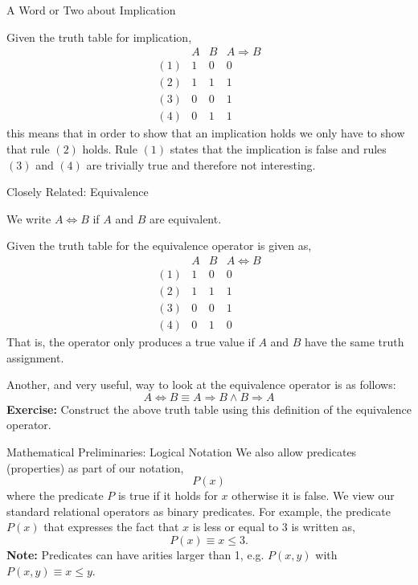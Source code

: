 \documentclass{beamer}
\begin{document}
\begin{frame}{A Word or Two about Implication}

Given the truth table for implication,
\[
\begin{array}{lcc|c}
&A & B & A \Rightarrow B\\ \hline
(1)& 1 & 0 & 0\\
(2) & 1 & 1 & 1\\
(3) & 0 & 0 & 1\\
(4) & 0 & 1 & 1
\end{array}
\]
this means that in order to show that an implication holds we only have to show that rule $(2)$
holds.  Rule $(1)$ states that the implication is false and rules $(3)$ and $(4)$ are trivially true and
therefore not interesting.
\end{frame}

\begin{frame}{Closely Related: Equivalence}

We write $A \Leftrightarrow B$ if $A$ and $B$ are equivalent.

Given the truth table for the equivalence operator is given as,
\[
\begin{array}{lcc|c}
&A & B & A \Leftrightarrow B\\ \hline
(1)& 1 & 0 & 0\\
(2) & 1 & 1 & 1\\
(3) & 0 & 0 & 1\\
(4) & 0 & 1 & 0
\end{array}
\]
That is, the operator only produces a true value if $A$ and $B$ have the same truth assignment.

Another, and very useful, way to look at the equivalence operator is as follows:
\[
A \Leftrightarrow B \equiv A \Rightarrow B \wedge B \Rightarrow A
\]
{\bf Exercise:} Construct  the above truth table using this definition of the equivalence operator.
\end{frame}

\begin{frame}{\large Mathematical  Preliminaries: Logical Notation}
We also allow predicates (properties) as part of our notation,
\[
P(x)
\]
where the predicate $P$ is true if it holds for $x$ otherwise it is false.  We view our
standard relational operators as binary predicates.  For example, the predicate
$P(x)$ that expresses the fact that $x$ is less or equal to 3 is written as,
\[
P(x) \equiv x \le 3.
\]
{\bf Note:} Predicates can have arities larger than 1, e.g. $P(x,y)$ with $P(x,y)\equiv x \le y$.
\end{frame}
\end{document}
